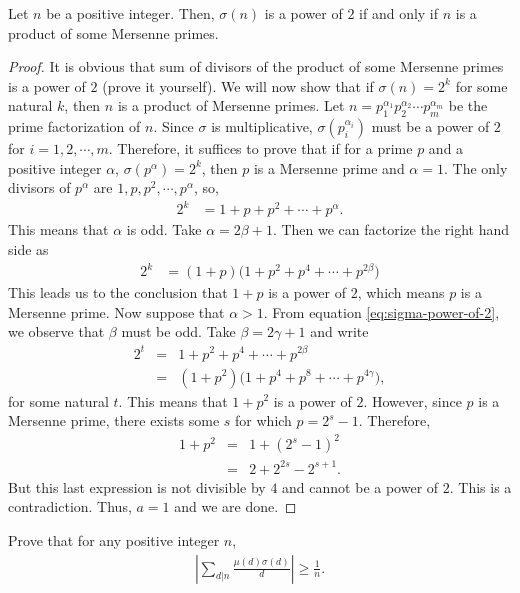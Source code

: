 \documentclass[12pt]{subfile}
\begin{document}
	\begin{theorem}
		Let $n$ be a positive integer. Then, $\sigma(n)$ is a power of $2$ if and only if $n$ is a product of some Mersenne primes.
	\end{theorem}

	\begin{proof}
		It is obvious that sum of divisors of the product of some Mersenne primes is a power of $2$ (prove it yourself). We will now show that if $\sigma(n)=2^k$ for some natural $k$, then $n$ is a product of Mersenne primes. Let $n = p_1^{\alpha_1}p_2^{\alpha_2} \cdots p_m^{\alpha_m}$ be the prime factorization of $n$. Since $\sigma$ is multiplicative,  $\sigma(p_i^{\alpha_i})$ must be a power of $2$ for $i=1,2,\cdots,m$. Therefore, it suffices to prove that if for a prime $p$ and a positive integer $\alpha$, $\sigma(p^\alpha) = 2^k$, then $p$ is a Mersenne prime and $\alpha = 1$. The only divisors of $p^\alpha$ are $1,p,p^2,\cdots,p^\alpha$, so,
			\begin{align*}
				2^k &= 1 + p + p^2 + \cdots + p^\alpha.
			\end{align*}
		This means that $\alpha$ is odd. Take $\alpha= 2\beta+ 1$. Then we can factorize the right hand side as
			\begin{align}
				2^k &= (1+p)\Big(1 + p^2 + p^4 + \cdots + p^{2\beta}\Big) \label{eq:sigma-power-of-2}
			\end{align}
		This leads us to the conclusion that $1+p$ is a power of $2$, which means $p$ is a Mersenne prime. Now suppose that $\alpha > 1$. From equation \ref{eq:sigma-power-of-2}, we observe that $\beta$ must be odd. Take $\beta = 2 \gamma + 1$ and write
			\begin{eqnarray*}
				2^t &=& 1 + p^2 + p^4 + \cdots + p^{2\beta}\\
					&=& \left(1+p^2\right)\Big(1+p^4 + p^8 + \cdots + p^{4 \gamma}\Big),
			\end{eqnarray*}
		for some natural $t$. This means that $1+p^2$ is a power of $2$. However, since $p$ is a Mersenne prime, there exists some $s$ for which $p=2^s - 1$. Therefore,
			\begin{eqnarray*}
				1+p^2 &=& 1 + (2^s -1)^2\\
					  &=& 2 + 2^{2s} - 2^{s+1}.
			\end{eqnarray*}
		But this last expression is not divisible by $4$ and cannot be a power of $2$. This is a contradiction. Thus, $a=1$ and we are done.
	\end{proof}


	\begin{problem}
		Prove that for any positive integer $n$,
			\begin{align*}
				\left|\sum_{d|n}\frac{\mu(d)\sigma(d)}{d}\right| \geq \frac{1}{n}.
			\end{align*}
	\end{problem}
\end{document}
